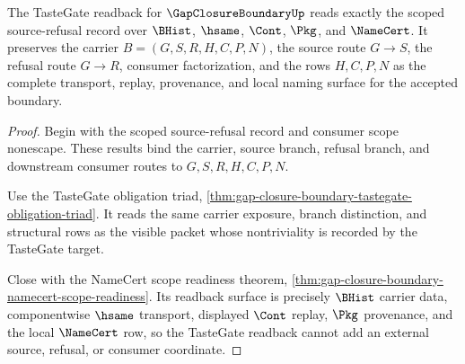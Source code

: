 \begin{theorem}
\label{thm:gap-closure-boundary-tastegate-scope-readback}
The TasteGate readback for $\GapClosureBoundaryUp$ reads exactly the scoped source-refusal record over $\BHist$, $\hsame$, $\Cont$, $\Pkg$, and $\NameCert$. It preserves the carrier $B=(G,S,R,H,C,P,N)$, the source route $G \longrightarrow S$, the refusal route $G \longrightarrow R$, consumer factorization, and the rows $H,C,P,N$ as the complete transport, replay, provenance, and local naming surface for the accepted boundary.
\end{theorem}
\begin{proof}
Begin with the scoped source-refusal record and consumer scope nonescape. These results bind the carrier, source branch, refusal branch, and downstream consumer routes to $G,S,R,H,C,P,N$.

Use the TasteGate obligation triad, \autoref{thm:gap-closure-boundary-tastegate-obligation-triad}. It reads the same carrier exposure, branch distinction, and structural rows as the visible packet whose nontriviality is recorded by the TasteGate target.

Close with the NameCert scope readiness theorem, \autoref{thm:gap-closure-boundary-namecert-scope-readiness}. Its readback surface is precisely $\BHist$ carrier data, componentwise $\hsame$ transport, displayed $\Cont$ replay, $\Pkg$ provenance, and the local $\NameCert$ row, so the TasteGate readback cannot add an external source, refusal, or consumer coordinate.
\end{proof}
